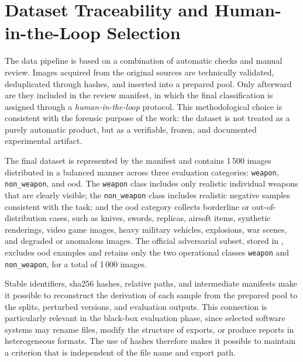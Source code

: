 \section{Dataset Traceability and Human-in-the-Loop Selection}
\label{app:dataset-traceability-human-in-the-loop}

The data pipeline is based on a combination of automatic checks and manual
review. Images acquired from the original sources are technically validated,
deduplicated through hashes, and inserted into a prepared pool. Only afterward
are they included in the review manifest, in which the final classification is
assigned through a \textit{human-in-the-loop} protocol. This methodological
choice is consistent with the forensic purpose of the work: the dataset is not
treated as a purely automatic product, but as a verifiable, frozen, and
documented experimental artifact.

The final dataset is represented by the
 manifest and contains 1\,500 images
distributed in a balanced manner across three evaluation categories:
\texttt{weapon}, \texttt{non\_weapon}, and \gls{ood}. The \texttt{weapon} class
includes only realistic individual weapons that are clearly visible; the
\texttt{non\_weapon} class includes realistic negative samples consistent with
the task; and the \gls{ood} category collects borderline or
out-of-distribution cases, such as knives, swords, replicas, airsoft items,
synthetic renderings, video game images, heavy military vehicles, explosions,
war scenes, and degraded or anomalous images. The official adversarial subset,
stored in , excludes
\gls{ood} examples and retains only the two operational classes
\texttt{weapon} and \texttt{non\_weapon}, for a total of 1\,000 images.

Stable identifiers, \gls{sha256} hashes, relative paths, and intermediate
manifests make it possible to reconstruct the derivation of each sample from
the prepared pool to the splits, perturbed versions, and evaluation outputs.
This connection is particularly relevant in the black-box evaluation phase,
since selected software systems may rename files, modify the structure of
exports, or produce reports in heterogeneous formats. The use of hashes
therefore makes it possible to maintain a criterion that is independent of the
file name and export path.


